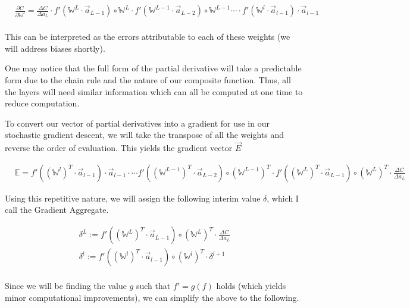 \documentclass[8pt]{amsart}
\newcommand\mat[1]{\mathbb{#1}}
\begin{document}
\[
    \begin{aligned}
        & \frac{ \partial C }{ \partial \mat{W}^l } = \frac{ \Delta C }{ \Delta a_L }
            \cdot
                f'(\mat{W}^L \cdot \vec{a}_{L - 1}) \circ \mat{W}^L
            \cdot
                f'(\mat{W}^{L - 1} \cdot \vec{a}_{L - 2}) \circ \mat{W}^{L - 1}
            \cdots
            \cdot
                f'(\mat{W}^l \cdot \vec{a}_{l - 1}) \cdot \vec{a}_{l - 1} \\
    \end{aligned}
\]

This can be interpreted as the errors attributable to each of these weights (we will
address biases shortly).

One may notice that the full form of the partial derivative will take a
predictable form due to the chain rule and the nature of our composite function.
Thus, all the layers will need similar information which can all be computed
at one time to reduce computation.

To convert our vector of partial derivatives into a gradient for use in our stochastic
gradient descent, we will take the transpose of all the weights and reverse the order
of evaluation. This yields the gradient vector $\vec{E}$

\[
    \begin{aligned}
        & \mat{E} = f'( (\mat{W}^l)^T \cdot \vec{a}_{l - 1}) \cdot \vec{a}_{l - 1}
            \cdot
            \cdots
                f'( (\mat{W}^{L - 1})^T \cdot \vec{a}_{L - 2} ) \circ (\mat{W}^{L - 1})^T
            \cdot
                f'( (\mat{W}^L)^T \cdot \vec{a}_{L - 1} ) \circ (\mat{W}^L)^T
            \cdot
                \frac{ \Delta C }{ \Delta a_L }
    \end{aligned}
\]

Using this repetitive nature, we will assign the following interim value $\delta$,
which I call the Gradient Aggregate.

\[
    \begin{aligned}
        \delta^L := f'( (\mat{W}^L)^T \cdot \vec{a}_{L - 1} ) \circ (\mat{W}^L)^T \cdot \frac{ \Delta C }{ \Delta a_L } \\
        \delta^l := f'( (\mat{W}^{l})^T \cdot \vec{a}_{l - 1} ) \circ (\mat{W}^{l})^T \cdot \delta^{l + 1} \\
    \end{aligned}
\]

Since we will be finding the value $g$ such that $f' = g(f)$ holds (which yields minor
computational improvements), we can simplify the above to the following.
\end{document}
